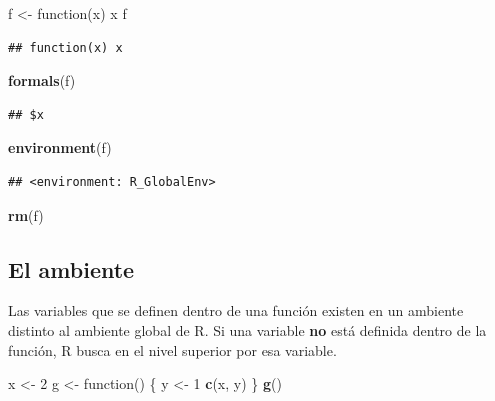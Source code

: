 \documentclass[]{article}
\newenvironment{Shaded}{\begin{snugshade}}{\end{snugshade}}
\newcommand{\KeywordTok}[1]{\textcolor[rgb]{0.13,0.29,0.53}{\textbf{{#1}}}}
\newcommand{\DecValTok}[1]{\textcolor[rgb]{0.00,0.00,0.81}{{#1}}}
\newcommand{\StringTok}[1]{\textcolor[rgb]{0.31,0.60,0.02}{{#1}}}
\newcommand{\NormalTok}[1]{{#1}}
\begin{document}
\begin{Shaded}
\begin{Highlighting}[]
\NormalTok{f <-}\StringTok{ }\NormalTok{function(x) x}
\NormalTok{f}
\end{Highlighting}
\end{Shaded}

\begin{verbatim}
## function(x) x
\end{verbatim}

\begin{Shaded}
\begin{Highlighting}[]
\KeywordTok{formals}\NormalTok{(f)}
\end{Highlighting}
\end{Shaded}

\begin{verbatim}
## $x
\end{verbatim}

\begin{Shaded}
\begin{Highlighting}[]
\KeywordTok{environment}\NormalTok{(f)}
\end{Highlighting}
\end{Shaded}

\begin{verbatim}
## <environment: R_GlobalEnv>
\end{verbatim}

\begin{Shaded}
\begin{Highlighting}[]
\KeywordTok{rm}\NormalTok{(f)}
\end{Highlighting}
\end{Shaded}

\subsection{El ambiente}\label{el-ambiente}

Las variables que se definen dentro de una función existen en un
ambiente distinto al ambiente global de R. Si una variable \textbf{no}
está definida dentro de la función, R busca en el nivel superior por esa
variable.

\begin{Shaded}
\begin{Highlighting}[]
\NormalTok{x <-}\StringTok{ }\DecValTok{2}
\NormalTok{g <-}\StringTok{ }\NormalTok{function() \{}
    \NormalTok{y <-}\StringTok{ }\DecValTok{1}
    \KeywordTok{c}\NormalTok{(x, y)}
\NormalTok{\}}
\KeywordTok{g}\NormalTok{()}
\end{Highlighting}
\end{Shaded}
\end{document}
